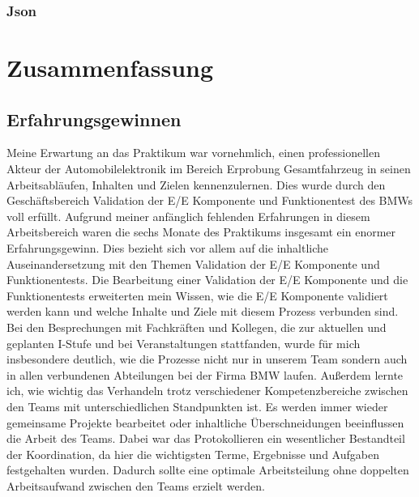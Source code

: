 \documentclass[10pt,a4paper]{report}
\begin{document}
\subsection{Json}

\chapter{Zusammenfassung}

\section{Erfahrungsgewinnen}
Meine Erwartung an das Praktikum war vornehmlich, einen professionellen Akteur der Automobilelektronik im Bereich Erprobung Gesamtfahrzeug in seinen Arbeitsabläufen, Inhalten und Zielen kennenzulernen. Dies wurde durch den Geschäftsbereich Validation der E/E Komponente und Funktionentest des BMWs voll erfüllt.
Aufgrund meiner anfänglich fehlenden Erfahrungen in diesem Arbeitsbereich waren die sechs Monate des Praktikums insgesamt ein enormer Erfahrungsgewinn. Dies bezieht sich vor allem auf die inhaltliche Auseinandersetzung mit den Themen Validation der E/E Komponente und Funktionentests. Die Bearbeitung einer Validation der E/E Komponente und die Funktionentests erweiterten mein Wissen, wie die E/E Komponente validiert werden kann und welche Inhalte und Ziele mit diesem Prozess verbunden sind. Bei den Besprechungen mit Fachkräften und Kollegen, die zur aktuellen und geplanten I-Stufe und bei Veranstaltungen stattfanden, wurde für mich insbesondere deutlich, wie die Prozesse nicht nur in unserem Team sondern auch in allen verbundenen Abteilungen bei der Firma BMW laufen. Außerdem lernte ich, wie wichtig das Verhandeln trotz verschiedener Kompetenzbereiche zwischen den Teams mit unterschiedlichen Standpunkten ist. Es werden immer wieder gemeinsame Projekte bearbeitet oder inhaltliche Überschneidungen beeinflussen die Arbeit des Teams. Dabei war das Protokollieren ein wesentlicher Bestandteil der Koordination, da hier die wichtigsten Terme, Ergebnisse und Aufgaben festgehalten wurden. Dadurch sollte eine optimale Arbeitsteilung ohne doppelten Arbeitsaufwand zwischen den Teams erzielt werden.
\end{document}
